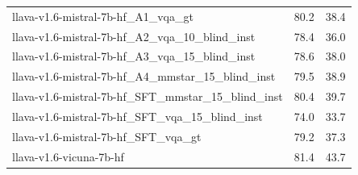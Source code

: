 \begin{tabular}{lrr}
llava-v1.6-mistral-7b-hf_A1_vqa_gt & 80.2 & 38.4 \\
llava-v1.6-mistral-7b-hf_A2_vqa_10_blind_inst & 78.4 & 36.0 \\
llava-v1.6-mistral-7b-hf_A3_vqa_15_blind_inst & 78.6 & 38.0 \\
llava-v1.6-mistral-7b-hf_A4_mmstar_15_blind_inst & 79.5 & 38.9 \\
llava-v1.6-mistral-7b-hf_SFT_mmstar_15_blind_inst & 80.4 & 39.7 \\
llava-v1.6-mistral-7b-hf_SFT_vqa_15_blind_inst & 74.0 & 33.7 \\
llava-v1.6-mistral-7b-hf_SFT_vqa_gt & 79.2 & 37.3 \\
llava-v1.6-vicuna-7b-hf & 81.4 & 43.7 \\
\bottomrule
\end{tabular}

